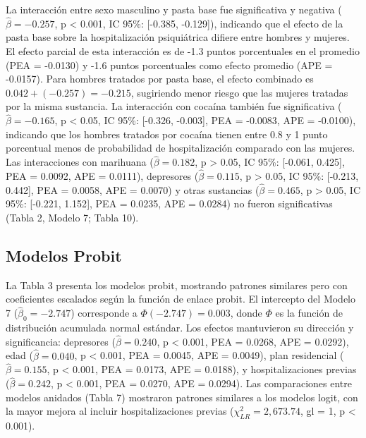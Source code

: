 \documentclass[
  spanish,
  10pt,
]{article}
\begin{document}
La interacción entre sexo masculino y pasta base fue significativa y
negativa (\(\hat{\beta} = -0.257\), p \textless{} 0.001, IC 95\%:
{[}-0.385, -0.129{]}), indicando que el efecto de la pasta base sobre la
hospitalización psiquiátrica difiere entre hombres y mujeres. El efecto
parcial de esta interacción es de -1.3 puntos porcentuales en el
promedio (PEA = -0.0130) y -1.6 puntos porcentuales como efecto promedio
(APE = -0.0157). Para hombres tratados por pasta base, el efecto
combinado es \(0.042 + (-0.257) = -0.215\), sugiriendo menor riesgo que
las mujeres tratadas por la misma sustancia. La interacción con cocaína
también fue significativa (\(\hat{\beta} = -0.165\), p \textless{} 0.05,
IC 95\%: {[}-0.326, -0.003{]}, PEA = -0.0083, APE = -0.0100), indicando
que los hombres tratados por cocaína tienen entre 0.8 y 1 punto
porcentual menos de probabilidad de hospitalización comparado con las
mujeres. Las interacciones con marihuana (\(\hat{\beta} = 0.182\), p
\textgreater{} 0.05, IC 95\%: {[}-0.061, 0.425{]}, PEA = 0.0092, APE =
0.0111), depresores (\(\hat{\beta} = 0.115\), p \textgreater{} 0.05, IC
95\%: {[}-0.213, 0.442{]}, PEA = 0.0058, APE = 0.0070) y otras
sustancias (\(\hat{\beta} = 0.465\), p \textgreater{} 0.05, IC 95\%:
{[}-0.221, 1.152{]}, PEA = 0.0235, APE = 0.0284) no fueron
significativas (Tabla 2, Modelo 7; Tabla 10).

\subsection{Modelos Probit}\label{modelos-probit}

La Tabla 3 presenta los modelos probit, mostrando patrones similares
pero con coeficientes escalados según la función de enlace probit. El
intercepto del Modelo 7 (\(\hat{\beta}_0 = -2.747\)) corresponde a
\(\Phi(-2.747) = 0.003\), donde \(\Phi\) es la función de distribución
acumulada normal estándar. Los efectos mantuvieron su dirección y
significancia: depresores (\(\hat{\beta} = 0.240\), p \textless{} 0.001,
PEA = 0.0268, APE = 0.0292), edad (\(\hat{\beta} = 0.040\), p
\textless{} 0.001, PEA = 0.0045, APE = 0.0049), plan residencial
(\(\hat{\beta} = 0.155\), p \textless{} 0.001, PEA = 0.0173, APE =
0.0188), y hospitalizaciones previas (\(\hat{\beta} = 0.242\), p
\textless{} 0.001, PEA = 0.0270, APE = 0.0294). Las comparaciones entre
modelos anidados (Tabla 7) mostraron patrones similares a los modelos
logit, con la mayor mejora al incluir hospitalizaciones previas
(\(\chi^2_{LR} = 2,673.74\), gl = 1, p \textless{} 0.001).
\end{document}
